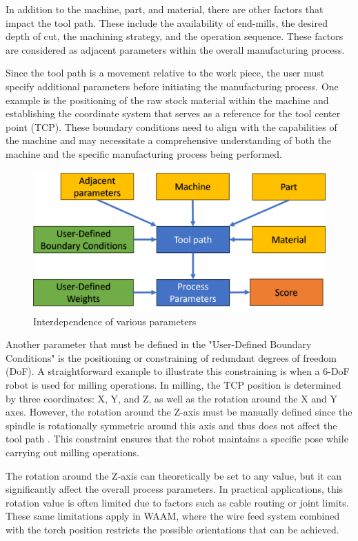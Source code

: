 In addition to the machine, part, and material, there are other factors that impact the tool path. These include the availability of end-mills, the desired depth of cut, the machining strategy, and the operation sequence. These factors are considered as adjacent parameters within the overall manufacturing process. 


Since the tool path is a movement relative to the work piece, the user must specify additional parameters before initiating the manufacturing process. One example is the positioning of the raw stock material within the machine and establishing the coordinate system that serves as a reference for the tool center point (TCP). These boundary conditions need to align with the capabilities of the machine and may necessitate a comprehensive understanding of both the machine and the specific manufacturing process being performed.


\begin{figure}[H]
	\centerline{\includegraphics[scale=.6]{figures/BasicScore.png}}
	\caption{Interdependence of various parameters}
	\label{BasicScore}
\end{figure}

Another parameter that must be defined in the "User-Defined Boundary Conditions" is the positioning or constraining of redundant degrees of freedom (DoF). A straightforward example to illustrate this constraining is when a 6-DoF robot is used for milling operations. In milling, the TCP position is determined by three coordinates: X, Y, and Z, as well as the rotation around the X and Y axes. However, the rotation around the Z-axis must be manually defined since the spindle is rotationally symmetric around this axis and thus does not affect the tool path . This constraint ensures that the robot maintains a specific pose while carrying out milling operations.

The rotation around the Z-axis can theoretically be set to any value, but it can significantly affect the overall process parameters. In practical applications, this rotation value is often limited due to factors such as cable routing or joint limits. These same limitations apply in WAAM, where the wire feed system combined with the torch position restricts the possible orientations that can be achieved.

